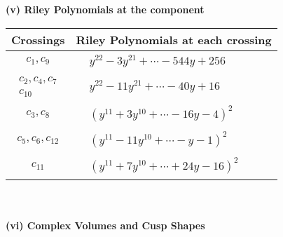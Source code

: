 \documentclass[1p]{elsarticle_modified}
\theoremstyle{definition}
\begin{document}
\newpage\renewcommand{\arraystretch}{1}
\flushleft \textbf{(v) Riley Polynomials at the component}\newline \\
\begin{tabular}{m{50pt}|m{274pt}}
Crossings & \hspace{64pt}Riley Polynomials at each crossing \\
\hline $$\begin{aligned}c_{1},c_{9}\end{aligned}$$&$\begin{aligned}
&y^{22}-3 y^{21}+\cdots-544 y+256
\end{aligned}$\\
\hline $$\begin{aligned}c_{2},c_{4},c_{7}\\c_{10}\end{aligned}$$&$\begin{aligned}
&y^{22}-11 y^{21}+\cdots-40 y+16
\end{aligned}$\\
\hline $$\begin{aligned}c_{3},c_{8}\end{aligned}$$&$\begin{aligned}
&(y^{11}+3 y^{10}+\cdots-16 y-4)^{2}
\end{aligned}$\\
\hline $$\begin{aligned}c_{5},c_{6},c_{12}\end{aligned}$$&$\begin{aligned}
&(y^{11}-11 y^{10}+\cdots- y-1)^{2}
\end{aligned}$\\
\hline $$\begin{aligned}c_{11}\end{aligned}$$&$\begin{aligned}
&(y^{11}+7 y^{10}+\cdots+24 y-16)^{2}
\end{aligned}$\\
\hline
\end{tabular}\\~\\
\newpage\flushleft \textbf{(vi) Complex Volumes and Cusp Shapes}
\end{document}
